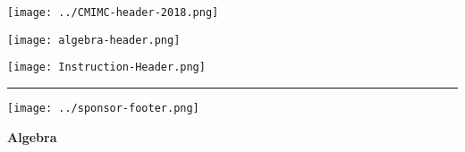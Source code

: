\documentclass[10pt]{article}
\begin{document}
\thispagestyle{empty}
\begin{center}

\vspace*{40pt}

\texttt{[image: ../CMIMC-header-2018.png]}

\texttt{[image: algebra-header.png]}

\vspace{1.4in}

\texttt{[image: Instruction-Header.png]}
\noindent\rule{15.7cm}{2pt}
\end{center}

\vspace{10pt}



\vspace{0.7in}

\begin{center}
\texttt{[image: ../sponsor-footer.png]}
\end{center}
\newpage

\begin{center}
\huge\textbf{Algebra}\normalsize

\vspace{3pt}
\end{center}
\end{document}
